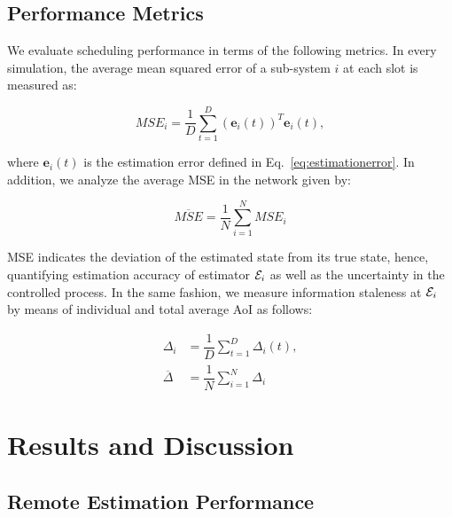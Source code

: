 \subsection{Performance Metrics} 

We evaluate scheduling performance in terms of the following metrics. In every
simulation, the average mean squared error of a sub-system $i$ at each slot is
measured as:

\begin{equation*}
  MSE_i = \dfrac{1}{D} \sum_{t=1}^{D}{(\boldsymbol{e}_i(t))^T \boldsymbol{e}_i(t)},
\end{equation*}

where $\boldsymbol{e}_i(t)$ is the estimation error defined in
Eq.~\eqref{eq:estimationerror}. In addition, we analyze the average MSE in the
network given by:

\begin{equation*}
  \overline{MSE} = \dfrac{1}{N} \sum_{i=1}^{N}{MSE_i}
\end{equation*}

MSE indicates the deviation of the estimated state from its true state, hence,
quantifying estimation accuracy of estimator $\mathcal{E}_i$ as well as the
uncertainty in the controlled process. In the same fashion, we measure
information staleness at $\mathcal{E}_i$ by means of individual and total average
AoI as follows:

\begin{align*}
  \Delta_i &= \dfrac{1}{D} \sum_{t=1}^{D}{\Delta_i(t)}, \\
  \overline{\Delta} &= \dfrac{1}{N} \sum_{i=1}^{N}{\Delta_i}
\end{align*}

\section{Results and Discussion} \label{sec:results}

\subsection{Remote Estimation Performance}

